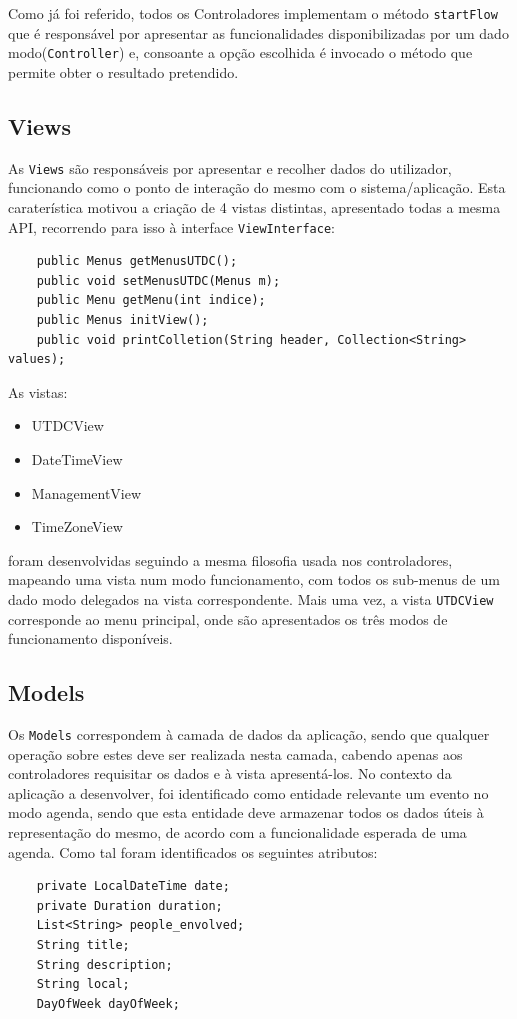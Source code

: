 \documentclass{article}
\begin{document}
Como já foi referido, todos os Controladores implementam o método \texttt{startFlow} que é responsável por apresentar as funcionalidades disponibilizadas por um
dado modo(\texttt{Controller}) e, consoante a opção escolhida é invocado o método que permite obter o resultado pretendido.

\subsection{Views}
As \texttt{Views} são responsáveis por apresentar e recolher dados do utilizador, funcionando como o ponto de interação do mesmo com o sistema/aplicação.
Esta caraterística motivou a criação de 4 vistas distintas, apresentado todas a mesma API, recorrendo para isso à interface \texttt{ViewInterface}:
\begin{verbatim}
    public Menus getMenusUTDC();
    public void setMenusUTDC(Menus m);
    public Menu getMenu(int indice);
    public Menus initView();
    public void printColletion(String header, Collection<String> values); 
\end{verbatim}

As vistas:
\begin{itemize}
    \item UTDCView
    \item DateTimeView
    \item ManagementView
    \item TimeZoneView
\end{itemize}
foram desenvolvidas seguindo a mesma filosofia usada nos controladores, mapeando uma vista num modo funcionamento, com todos os sub-menus de um dado modo delegados na vista correspondente. Mais uma vez, a vista \texttt{UTDCView} corresponde ao menu principal, onde são apresentados os três modos de funcionamento disponíveis.

\subsection{Models}
Os \texttt{Models} correspondem à camada de dados da aplicação, sendo que qualquer operação sobre estes deve ser realizada nesta camada, cabendo apenas aos controladores requisitar os dados e à vista apresentá-los.
No contexto da aplicação a desenvolver, foi identificado como entidade relevante um evento no modo agenda, sendo que esta entidade deve armazenar todos os dados úteis à representação do mesmo, de acordo com a funcionalidade esperada de uma agenda. Como tal foram identificados os seguintes atributos:
\begin{verbatim}
    private LocalDateTime date;
    private Duration duration;
    List<String> people_envolved;
    String title;
    String description;
    String local;
    DayOfWeek dayOfWeek;
\end{verbatim}
\end{document}
